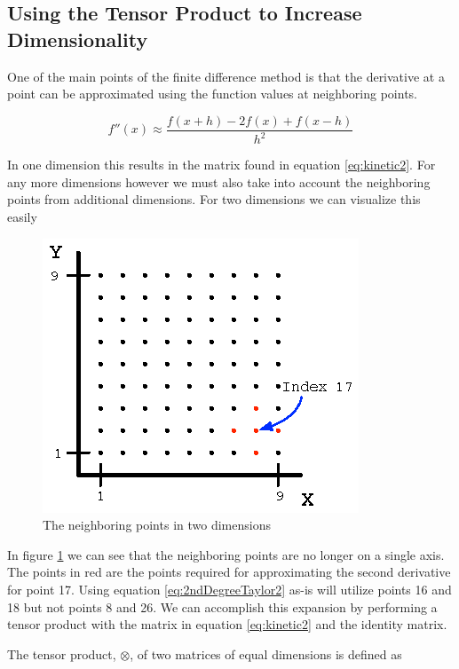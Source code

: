 \documentclass[authoryearcitations]{UoYCSproject}
\begin{document}
\subsection{Using the Tensor Product to Increase Dimensionality}
\label{sec:tensor}
One of the main points of the finite difference method is that the derivative at a point can be approximated
using the function values at neighboring points.

\begin{equation}
f''(x) \approx \frac{f(x + h) - 2f(x) + f(x - h)}{h^2}
\label{eq:2ndDegreeTaylor2}
\end{equation}

In one dimension this results in the matrix found in equation \ref{eq:kinetic2}. For any more dimensions however
we must also take into account the neighboring points from additional dimensions. For two dimensions we can visualize
this easily

\begin{figure}
\centering
  \includegraphics[scale=1.2]{figures/finite2D.eps}
  \caption{The neighboring points in two dimensions}
\label{fig:finite2D}
\end{figure}

In figure \ref{fig:finite2D} we can see that the neighboring points are no longer on a single axis. The points in red
are the points required for approximating the second derivative for point 17. Using equation \ref{eq:2ndDegreeTaylor2} as-is
will utilize points 16 and 18 but not points 8 and 26. We can accomplish this expansion by performing a tensor product
with the matrix in equation \ref{eq:kinetic2} and the identity matrix. 

The tensor product, $\otimes$, of two matrices of equal dimensions is defined as
\end{document}
